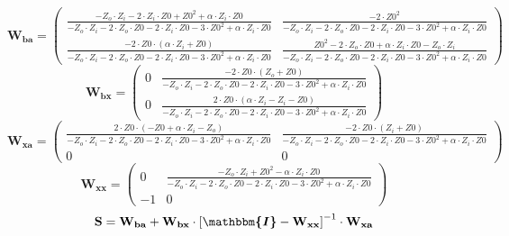 \[ \mathbf{W_{ba}} = \left(\begin{smallmatrix} \frac{-Z_o\cdot
Z_i-2\cdot Z_i\cdot Z0+Z0^2+\alpha\cdot Z_i\cdot Z0}{-Z_o\cdot
Z_i-2\cdot Z_o\cdot Z0-2\cdot Z_i\cdot Z0-3\cdot Z0^2+\alpha\cdot
Z_i\cdot Z0} & \frac{-2\cdot Z0^2}{-Z_o\cdot Z_i-2\cdot Z_o\cdot
Z0-2\cdot Z_i\cdot Z0-3\cdot Z0^2+\alpha\cdot Z_i\cdot Z0} \\
\frac{-2\cdot Z0 \cdot\left(\alpha\cdot Z_i +Z0\right)}{-Z_o\cdot
Z_i-2\cdot Z_o\cdot Z0-2\cdot Z_i\cdot Z0-3\cdot Z0^2+\alpha\cdot
Z_i\cdot Z0} & \frac{Z0^2-2\cdot Z_o\cdot Z0+\alpha\cdot Z_i\cdot
Z0-Z_o\cdot Z_i}{-Z_o\cdot Z_i-2\cdot Z_o\cdot Z0-2\cdot Z_i\cdot
Z0-3\cdot Z0^2+\alpha\cdot Z_i\cdot Z0} \end{smallmatrix}\right) \]
\[ \mathbf{W_{bx}} = \left(\begin{smallmatrix} 0 & \frac{-2\cdot
Z0\cdot\left(Z_o +Z0\right)}{-Z_o\cdot Z_i-2\cdot Z_o\cdot Z0-2\cdot
Z_i\cdot Z0-3\cdot Z0^2+\alpha\cdot Z_i\cdot Z0} \\ 0 & \frac{2\cdot
Z0\cdot\left(\alpha\cdot Z_i-Z_i-Z0\right)}{-Z_o\cdot Z_i-2\cdot
Z_o\cdot Z0-2\cdot Z_i\cdot Z0-3\cdot Z0^2+\alpha\cdot Z_i\cdot Z0}
\end{smallmatrix}\right) \]
\[ \mathbf{W_{xa}} = \left(\begin{smallmatrix} \frac{2\cdot
Z0\cdot\left(-Z0+\alpha\cdot Z_i-Z_o\right)}{-Z_o\cdot Z_i-2\cdot
Z_o\cdot Z0-2\cdot Z_i\cdot Z0-3\cdot Z0^2+\alpha\cdot Z_i\cdot Z0} &
\frac{-2\cdot Z0\cdot\left(Z_i+Z0\right)}{-Z_o\cdot Z_i-2\cdot
Z_o\cdot Z0-2\cdot Z_i\cdot Z0-3\cdot Z0^2+\alpha\cdot Z_i\cdot Z0} \\
0 & 0 \end{smallmatrix}\right) \]
\[ \mathbf{W_{xx}} = \left(\begin{smallmatrix} 0 & \frac{-Z_o\cdot
Z_i+Z0^2-\alpha\cdot Z_i\cdot Z0}{-Z_o\cdot Z_i-2\cdot Z_o\cdot
Z0-2\cdot Z_i\cdot Z0-3\cdot Z0^2+\alpha\cdot Z_i\cdot Z0} \\ -1 & 0
\end{smallmatrix}\right) \]
\[ \mathbf{S}=\mathbf{W_{ba}}+\mathbf{W_{bx}}\cdot\left[
\boldsymbol{\mathbbm{I}}
-\mathbf{W_{xx}}\right]^{-1}\cdot\mathbf{W_{xa}} \]
